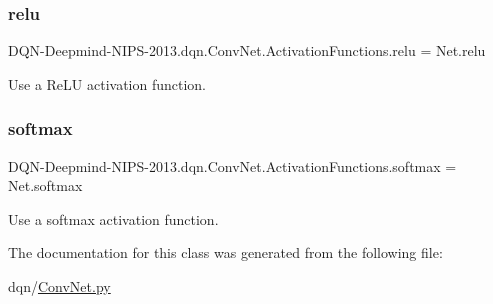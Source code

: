 \subsubsection{\texorpdfstring{relu}{relu}}
{\footnotesize\ttfamily D\+QN-\/Deepmind-\/N\+I\+PS-\/2013.dqn.\+Conv\+Net.\+Activation\+Functions.\+relu = Net.\+relu\hspace{0.3cm}{\ttfamily [static]}}



Use a Re\+LU activation function. 

\hypertarget{classDQN-Deepmind-NIPS-2013_1_1dqn_1_1ConvNet_1_1ActivationFunctions_a25cfb0b1f9d6d902e50f5bf77bf658a5}{}\label{classDQN-Deepmind-NIPS-2013_1_1dqn_1_1ConvNet_1_1ActivationFunctions_a25cfb0b1f9d6d902e50f5bf77bf658a5} 
\subsubsection{\texorpdfstring{softmax}{softmax}}
{\footnotesize\ttfamily D\+QN-\/Deepmind-\/N\+I\+PS-\/2013.dqn.\+Conv\+Net.\+Activation\+Functions.\+softmax = Net.\+softmax\hspace{0.3cm}{\ttfamily [static]}}



Use a softmax activation function. 



The documentation for this class was generated from the following file\+:\begin{DoxyCompactItemize}
\item 
dqn/\hyperlink{ConvNet_8py}{Conv\+Net.\+py}\end{DoxyCompactItemize}
